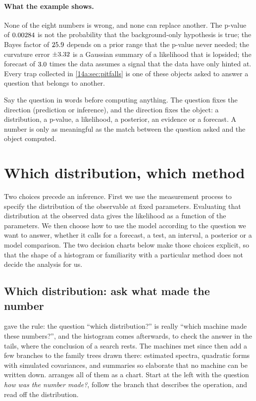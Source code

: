 \paragraph{What the example shows.}
None of the eight numbers is wrong, and none can replace another. The p-value of
$0.00284$ is not the probability that the background-only hypothesis is true; the
Bayes factor of $25.9$ depends on a prior range that the p-value never needed; the
curvature error $\pm3.32$ is a Gaussian summary of a likelihood that is
lopsided; the forecast of $3.0$ times the data assumes a signal that the data have
only hinted at. Every trap collected in \cref{14a:sec:pitfalls} is one of these objects
asked to answer a question that belongs to another.

\begin{keyidea}
Say the question in words before computing anything. The question fixes the direction
(prediction or inference), and the direction fixes the object: a distribution, a
p-value, a likelihood, a posterior, an evidence or a forecast. A number is only as
meaningful as the match between the question asked and the object computed.
\end{keyidea}
\section{Which distribution, which method}\label{14a:sec:which}

Two choices precede an inference. First we use the measurement process to
specify the distribution of the observable at fixed parameters. Evaluating
that distribution at the observed data gives the likelihood as a function of
the parameters. We then choose how to use the model according to the question
we want to answer, whether it calls for a forecast, a test, an interval, a
posterior or a model comparison. The two decision charts below make those
choices explicit, so that the shape of a histogram or familiarity with a
particular method does not decide the analysis for us.

\subsection{Which distribution: ask what made the number}\label{14a:sec:which-dist}

 gave the rule: the question ``which distribution?'' is really
``which machine made these numbers?'', and the histogram comes afterwards, to check
the answer in the tails, where the conclusion of a search rests. The machines met
since then add a few branches to the family trees drawn there: estimated spectra,
quadratic forms with simulated covariances, and summaries so elaborate that no
machine can be written down.  arranges all of them as a
chart. Start at the left with the question \emph{how was the number made?}, follow
the branch that describes the operation, and read off the distribution.

